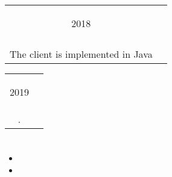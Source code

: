 \documentclass{article}
\newif\ifen
\newif\ifru
\newcommand{\en}[1]{\ifen#1\fi}
\newcommand{\ru}[1]{\ifru#1\fi}
\newcommand{\entry}[3]{
	\begin{tabular}{ c | c }
    \begin{minipage}{0.05\linewidth}
    	\begin{center}
    		#1
    	\end{center}
    \end{minipage} 
    &
    \begin{minipage}{0.85\linewidth}
        \textbf{#2} \\ \footnotesize{#3}
    \end{minipage}
    \end{tabular}
}
\begin{document}
        \vspace{.5em}
    
        \entry{2018}
        {\ru{Клиент-серверное приложение}\en{Client-Server Application}}
        {\ru{Сервер реализован на языке Python3 (Flask, SQLAlchemy);\\
        Клиент -- на языке Java}\en{The server is implemented in Python3 (Flask, SQLAlchemy)\\The client is implemented in Java}.} 
    

    
        \vspace{.5em}

        \entry{2019}
        {\ru{Симулятор движения небесных тел}\en{Celestial bodies motion simulator}}
        {\ru{Решение задачи $n$ тел с помощью метода Рунге-Кутта 1-го порядка на Python3 с использованием NumPy}\en{Solving n-body problem with 1st order Runge-Kutta method in Python3 using NumPy}.}
    
        \vspace{.5em}

    \section{\ru{Достижения}}
        \begin{itemize}
            \item \ru{Победитель первой степени олимпиады ИТМО по информатике}
            \item \ru{Хакатон TulaHack - 4 место}
        \end{itemize}

\end{document}
